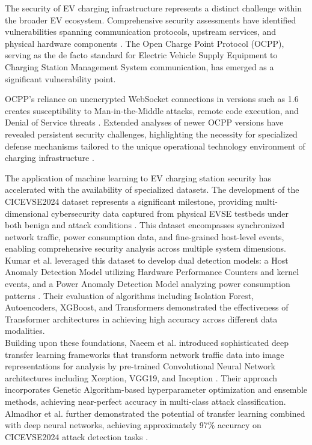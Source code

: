 The security of EV charging infrastructure represents a distinct challenge within the broader EV ecosystem. Comprehensive security assessments have identified vulnerabilities spanning communication protocols, upstream services, and physical hardware components \cite{antoun2020detailed, pourmirza2021electric}. The Open Charge Point Protocol (OCPP), serving as the de facto standard for Electric Vehicle Supply Equipment to Charging Station Management System communication, has emerged as a significant vulnerability point.

OCPP's reliance on unencrypted WebSocket connections in versions such as 1.6 creates susceptibility to Man-in-the-Middle attacks, remote code execution, and Denial of Service threats \cite{elmo2023disrupting, alcaraz2017ocpp}. Extended analyses of newer OCPP versions have revealed persistent security challenges, highlighting the necessity for specialized defense mechanisms tailored to the unique operational technology environment of charging infrastructure \cite{alcaraz2023ocpp}.

\newpage
The application of machine learning to EV charging station security has accelerated with the availability of specialized datasets. The development of the CICEVSE2024 dataset represents a significant milestone, providing multi-dimensional cybersecurity data captured from physical EVSE testbeds under both benign and attack conditions \cite{buedi2024enhancing}. This dataset encompasses synchronized network traffic, power consumption data, and fine-grained host-level events, enabling comprehensive security analysis across multiple system dimensions. \\

Kumar et al. leveraged this dataset to develop dual detection models: a Host Anomaly Detection Model utilizing Hardware Performance Counters and kernel events, and a Power Anomaly Detection Model analyzing power consumption patterns \cite{kumar2025machine}. Their evaluation of algorithms including Isolation Forest, Autoencoders, XGBoost, and Transformers demonstrated the effectiveness of Transformer architectures in achieving high accuracy across different data modalities. \\

Building upon these foundations, Naeem et al. introduced sophisticated deep transfer learning frameworks that transform network traffic data into image representations for analysis by pre-trained Convolutional Neural Network architectures including Xception, VGG19, and Inception \cite{naeem2025optimizing}. Their approach incorporates Genetic Algorithm-based hyperparameter optimization and ensemble methods, achieving near-perfect accuracy in multi-class attack classification. Almadhor et al. further demonstrated the potential of transfer learning combined with deep neural networks, achieving approximately 97\% accuracy on CICEVSE2024 attack detection tasks \cite{almadhor2025transfer}. \\

